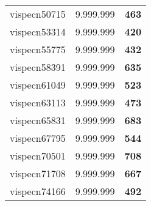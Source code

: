 \begin{tabular}{cc||c}
vispecn50715     & 9.999.999        & {\bf 463}       \\ 
vispecn53314     & 9.999.999        & {\bf 420}       \\ 
vispecn55775     & 9.999.999        & {\bf 432}       \\ 
vispecn58391     & 9.999.999        & {\bf 635}       \\ 
vispecn61049     & 9.999.999        & {\bf 523}       \\ 
vispecn63113     & 9.999.999        & {\bf 473}       \\ 
vispecn65831     & 9.999.999        & {\bf 683}       \\ 
vispecn67795     & 9.999.999        & {\bf 544}       \\ 
vispecn70501     & 9.999.999        & {\bf 708}       \\ 
vispecn71708     & 9.999.999        & {\bf 667}       \\ 
vispecn74166     & 9.999.999        & {\bf 492}       \\ 
\end{tabular}